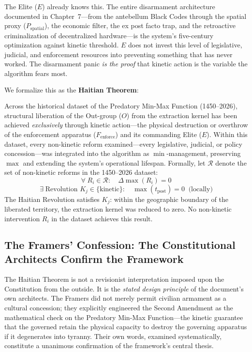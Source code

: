 \documentclass[12pt,openany]{book}
\begin{document}
The Elite ($E$) already knows this. The entire disarmament architecture documented in Chapter~7---from the antebellum Black Codes through the spatial proxy ($P_{\text{spatial}}$), the economic filter, the ex post facto trap, and the retroactive criminalization of decentralized hardware---is the system's five-century optimization against kinetic threshold. $E$ does not invest this level of legislative, judicial, and enforcement resources into preventing something that has never worked. The disarmament panic \textit{is the proof} that kinetic action is the variable the algorithm fears most.

We formalize this as the \textbf{Haitian Theorem}:

\begin{definition}
Across the historical dataset of the Predatory Min-Max Function (1450--2026), structural liberation of the Out-group ($O$) from the extraction kernel has been achieved \textit{exclusively} through kinetic action---the physical destruction or overthrow of the enforcement apparatus ($F_{\text{enforce}}$) and its commanding Elite ($E$). Within this dataset, every non-kinetic reform examined---every legislative, judicial, or policy concession---was integrated into the algorithm as $\min$-management, preserving $\max$ and extending the system's operational lifespan. Formally, let $\mathcal{R}$ denote the set of non-kinetic reforms in the 1450--2026 dataset:
\[
\forall\; R_i \in \mathcal{R}: \quad \Delta\max(R_i) = 0
\]
\[
\exists\; \text{Revolution } K_j \in \{\text{kinetic}\}: \quad \max(t_{\text{post}}) = 0 \;\;\text{(locally)}
\]
The Haitian Revolution satisfies $K_j$: within the geographic boundary of the liberated territory, the extraction kernel was reduced to zero. No non-kinetic intervention $R_i$ in the dataset achieves this result.
\end{definition}

\subsection{The Framers' Confession: The Constitutional Architects Confirm the Framework}

The Haitian Theorem is not a revisionist interpretation imposed upon the Constitution from the outside. It is the \textit{stated design principle} of the document's own architects. The Framers did not merely permit civilian armament as a cultural concession; they explicitly engineered the Second Amendment as the mathematical check on the Predatory Min-Max Function---the kinetic guarantee that the governed retain the physical capacity to destroy the governing apparatus if it degenerates into tyranny. Their own words, examined systematically, constitute a unanimous confirmation of the framework's central thesis.
\end{document}

